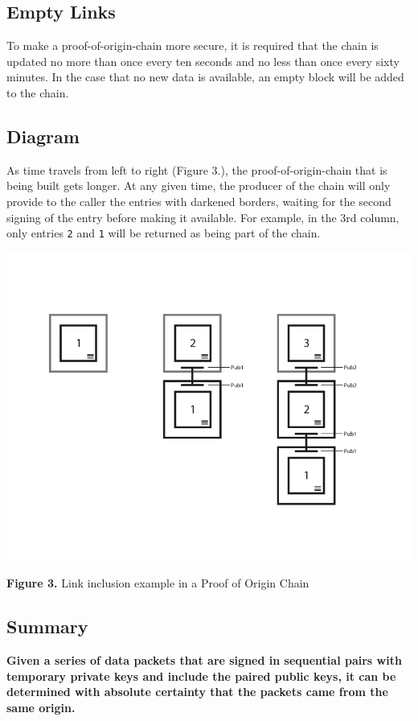 \documentclass{article}
\begin{document}
\subsection {Empty Links}
To make a \Gls{proof-of-origin-chain} more secure, it is required that the chain is updated no more than once every ten seconds and no less than once every sixty minutes. In the case that no new data is available, an empty block will be added to the chain.

\subsection {Diagram}
As time travels from left to right (Figure 3.), the \Gls{proof-of-origin-chain} that is being built gets longer. At any given time, the producer of the chain will only provide to the caller the entries with darkened borders, waiting for the second signing of the entry before making it available. For example, in the 3rd column, only entries \texttt{2} and \texttt{1} will be returned as being part of the chain.

\includegraphics[width=\textwidth] {proofoforigin}
\begin{center}\textbf{Figure 3.}  Link inclusion example in a Proof of Origin Chain
\end{center}

\subsection {Summary}
\textbf{Given a series of data packets that are signed in sequential pairs with temporary private keys and include the paired public keys, it can be determined with absolute \gls{certainty} that the packets came from the same origin.}
\end{document}
